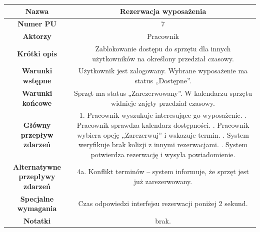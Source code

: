 \documentclass{article}
\begin{document}
    \begin{tabular}{|c|c|}%
        \hline
        \textbf{Nazwa} & Rezerwacja wyposażenia \\
        \hline
        \textbf{Numer PU} & 7 \\
        \hline
        \textbf{Aktorzy} & Pracownik \\
        \hline
        \textbf{Krótki opis} & Zablokowanie dostępu do sprzętu dla innych użytkowników na określony przedział czasowy. \\
        \hline
        \textbf{Warunki wstępne} & Użytkownik jest zalogowany. Wybrane wyposażenie ma status „Dostępne”. \\
        \hline
        \textbf{Warunki końcowe} & Sprzęt ma status „Zarezerwowany”. W kalendarzu sprzętu widnieje zajęty przedział czasowy. \\
        \hline
        \textbf{Główny przepływ zdarzeń} & 
            1. Pracownik wyszukuje interesujące go wyposażenie. \newline
            2. Pracownik sprawdza kalendarz dostępności. \newline
            3. Pracownik wybiera opcję „Zarezerwuj” i wskazuje termin. \newline
            4. System weryfikuje brak kolizji z innymi rezerwacjami. \newline
            5. System potwierdza rezerwację i wysyła powiadomienie. \\
        \hline
        \textbf{Alternatywne przepływy zdarzeń} & 
            4a. Konflikt terminów – system informuje, że sprzęt jest już zarezerwowany. \\
        \hline
        \textbf{Specjalne wymagania} & Czas odpowiedzi interfejsu rezerwacji poniżej 2 sekund. \\
        \hline
        \textbf{Notatki} & brak. \\
        \hline
    \end{tabular}

    \vspace{1cm}
\end{document}
